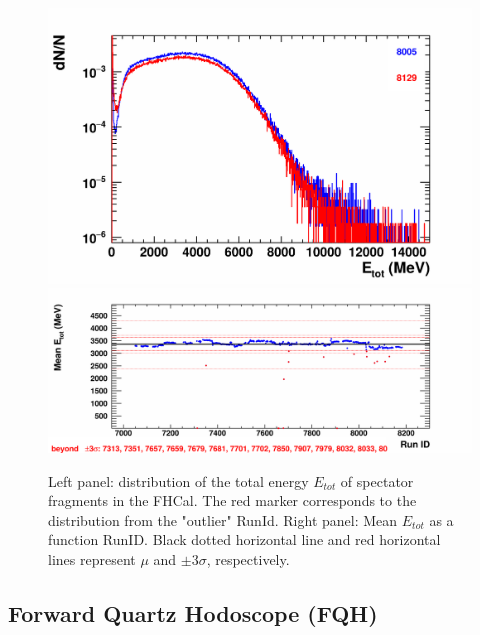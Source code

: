     \begin{figure}[H]
        \begin{center}
            \includegraphics[width=0.35\linewidth]{../pict/QA_RunByRun_24.12/H1/nVtxTr_h2_RunId_fhcal_e.png}
            \includegraphics[width=0.60\linewidth]{../pict/QA_RunByRun_24.12/nVtxTr_h2_RunId_fhcal_e.png}
            \vspace{-3mm}
            \caption{Left panel: distribution of the total energy $E_{tot}$ of spectator fragments in the FHCal. The red marker corresponds to the distribution from the "outlier" RunId. Right panel: Mean $E_{tot}$ as a function RunID. Black dotted horizontal line and red horizontal lines represent $\mu$ and $\pm3\sigma$, respectively.}
            \label{fig:FHCal}
        \end{center}
        \vspace{-5mm}
    \end{figure}




\subsection{Forward Quartz Hodoscope (FQH)}

